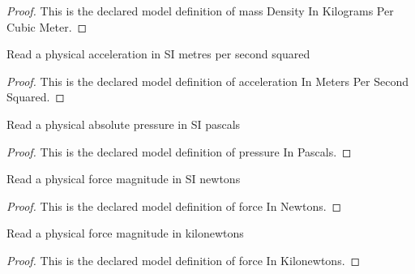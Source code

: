 \begin{proof}
  This is the declared model definition of mass Density In Kilograms Per Cubic Meter.
\end{proof}
\begin{definition}
  \label{def:physics:phyx-mini-0392:phyxminiproblems-problemphyxmini0392-accelerationinmeterspersecondsquared}
  Read a physical acceleration in SI metres per second squared
\end{definition}
\begin{proof}
  This is the declared model definition of acceleration In Meters Per Second Squared.
\end{proof}
\begin{definition}
  \label{def:physics:phyx-mini-0392:phyxminiproblems-problemphyxmini0392-pressureinpascals}
  Read a physical absolute pressure in SI pascals
\end{definition}
\begin{proof}
  This is the declared model definition of pressure In Pascals.
\end{proof}
\begin{definition}
  \label{def:physics:phyx-mini-0392:phyxminiproblems-problemphyxmini0392-forceinnewtons}
  Read a physical force magnitude in SI newtons
\end{definition}
\begin{proof}
  This is the declared model definition of force In Newtons.
\end{proof}
\begin{definition}
  \label{def:physics:phyx-mini-0392:phyxminiproblems-problemphyxmini0392-forceinkilonewtons}
  Read a physical force magnitude in kilonewtons
\end{definition}
\begin{proof}
  This is the declared model definition of force In Kilonewtons.
\end{proof}
